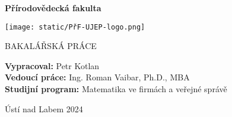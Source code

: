 \begin{titlepage}
    \begin{center}
        \Huge

        \textbf{\textsf{}}
            
        \vspace{1cm}
        \LARGE
        \textbf{\textsf{Přírodovědecká fakulta}}
        
        \vspace{2cm}
        \texttt{[image: static/PřF-UJEP-logo.png]}
        \vspace{3cm}
            
        \textbf{\textsf{}}
        
        \vspace{1cm}

        \large
        BAKALÁŘSKÁ PRÁCE

        \vfill

            \begin{flushleft}
                
            \large
            \textbf{Vypracoval:} Petr Kotlan \\
            \vspace{0.3cm}
            \textbf{Vedoucí práce:} Ing. Roman Vaibar, Ph.D., MBA \\
            \vspace{1.5cm}
            \textbf{Studijní program:} Matematika ve firmách a veřejné správě
        \end{flushleft}

        \vspace{1.5cm}
        
        \LARGE
        Ústí nad Labem 2024

    \end{center}
\end{titlepage}

